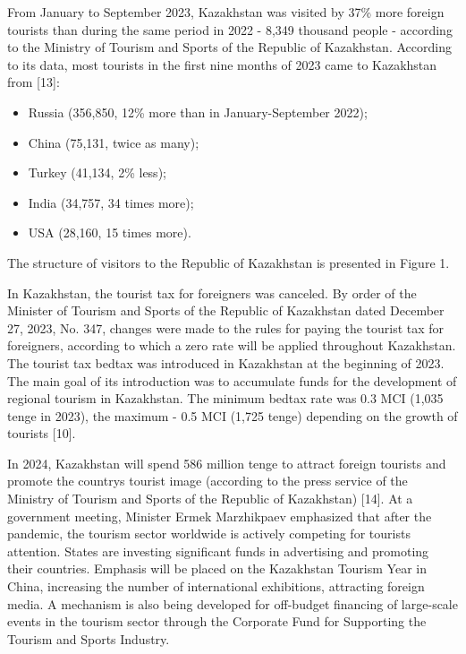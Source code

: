 \begin{multicols}{2}
From January to September 2023, Kazakhstan was visited by 37\% more
foreign tourists than during the same period in 2022 - 8,349 thousand
people - according to the Ministry of Tourism and Sports of the Republic
of Kazakhstan. According to its data, most tourists in the first nine
months of 2023 came to Kazakhstan from {[}13{]}:

\begin{itemize}
\item
  Russia (356,850, 12\% more than in January-September 2022);
\item
  China (75,131, twice as many);
\item
  Turkey (41,134, 2\% less);
\item
  India (34,757, 34 times more);
\item
  USA (28,160, 15 times more).
\end{itemize}

The structure of visitors to the Republic of Kazakhstan is presented in
Figure 1.

In Kazakhstan, the tourist tax for foreigners was canceled. By order of
the Minister of Tourism and Sports of the Republic of Kazakhstan dated
December 27, 2023, No. 347, changes were made to the rules for paying
the tourist tax for foreigners, according to which a zero rate will be
applied throughout Kazakhstan. The tourist tax bedtax was introduced in
Kazakhstan at the beginning of 2023. The main goal of its introduction
was to accumulate funds for the development of regional tourism in
Kazakhstan. The minimum bedtax rate was 0.3 MCI (1,035 tenge in 2023),
the maximum - 0.5 MCI (1,725 tenge) depending on the growth of tourists
{[}10{]}.

In 2024, Kazakhstan will spend 586 million tenge to attract foreign
tourists and promote the country\textquotesingle s tourist image
(according to the press service of the Ministry of Tourism and Sports of
the Republic of Kazakhstan) {[}14{]}. At a government meeting, Minister
Ermek Marzhikpaev emphasized that after the pandemic, the tourism sector
worldwide is actively competing for tourists\textquotesingle{}
attention. States are investing significant funds in advertising and
promoting their countries. Emphasis will be placed on the Kazakhstan
Tourism Year in China, increasing the number of international
exhibitions, attracting foreign media. A mechanism is also being
developed for off-budget financing of large-scale events in the tourism
sector through the Corporate Fund for Supporting the Tourism and Sports
Industry.


\end{multicols}
